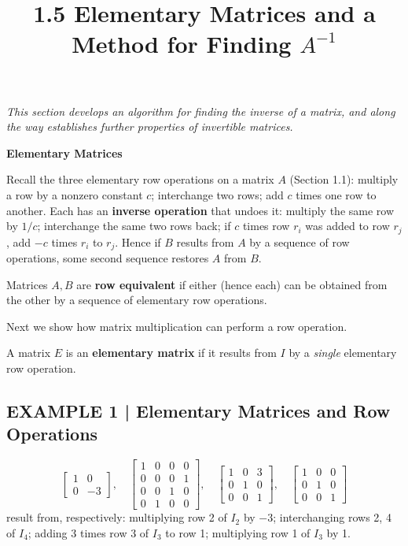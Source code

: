 \documentclass{article}
\title{1.5 Elementary Matrices and a Method for Finding $A^{-1}$}
\date{}
\author{}
\newcommand{\redheading}[1]{{\vspace{2mm}\noindent\Large\bfseries\color{red!55!black} #1\par}\vspace{2mm}}
\theoremstyle{mystyle}
\begin{document}
\maketitle

{\itshape\color{blue!45!black}
This section develops an algorithm for finding the inverse of a matrix, and along the way establishes further properties of invertible matrices.\par}

\redheading{Elementary Matrices}

Recall the three elementary row operations on a matrix $A$ (Section 1.1): multiply a row by a nonzero constant $c$; interchange two rows; add $c$ times one row to another. Each has an \textbf{inverse operation} that undoes it: multiply the same row by $1/c$; interchange the same two rows back; if $c$ times row $r_i$ was added to row $r_j$, add $-c$ times $r_i$ to $r_j$. Hence if $B$ results from $A$ by a sequence of row operations, some second sequence restores $A$ from $B$.

\begin{tcolorbox}[colback=teal!4, colframe=teal!65!black, title=Definition 1, fonttitle=\bfseries, boxrule=0.5mm, arc=3mm]
Matrices $A,B$ are \textbf{row equivalent} if either (hence each) can be obtained from the other by a sequence of elementary row operations.
\end{tcolorbox}

Next we show how matrix multiplication can perform a row operation.

\begin{tcolorbox}[colback=teal!4, colframe=teal!65!black, title=Definition 2, fonttitle=\bfseries, boxrule=0.5mm, arc=3mm]
A matrix $E$ is an \textbf{elementary matrix} if it results from $I$ by a \emph{single} elementary row operation.
\end{tcolorbox}

\subsection*{EXAMPLE 1 | Elementary Matrices and Row Operations}
\[
\begin{bmatrix}1&0\\0&-3\end{bmatrix},\quad
\begin{bmatrix}1&0&0&0\\0&0&0&1\\0&0&1&0\\0&1&0&0\end{bmatrix},\quad
\begin{bmatrix}1&0&3\\0&1&0\\0&0&1\end{bmatrix},\quad
\begin{bmatrix}1&0&0\\0&1&0\\0&0&1\end{bmatrix}
\]
result from, respectively: multiplying row 2 of $I_2$ by $-3$; interchanging rows 2, 4 of $I_4$; adding 3 times row 3 of $I_3$ to row 1; multiplying row 1 of $I_3$ by 1.
\end{document}
